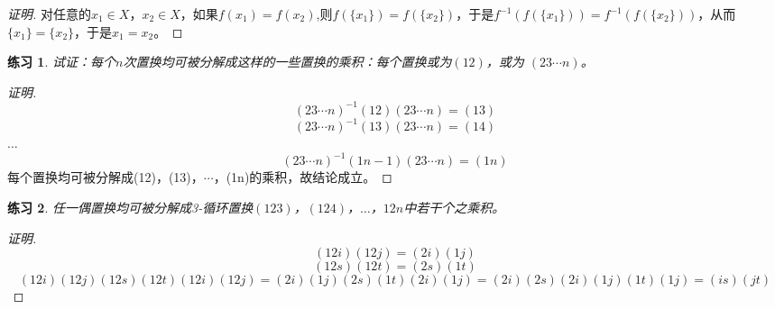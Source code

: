 \documentclass{article}
\newtheorem{Exercise}{练习}
\begin{document}
\begin{CJK*}{UTF8}{gbsn}
\begin{proof}[证明]
        对任意的$x_1\in X$，$x_2\in X$，如果$f(x_1)=f(x_2)$,则$f(\{x_1\})=f(\{x_2\})$，于是$f^{-1}(f(\{x_1\}))=f^{-1}(f(\{x_2\}))$，从而$\{x_1\}=\{x_2\}$，于是$x_1=x_2$。
        
      \end{proof}
  \clearpage     
  \begin{Exercise}
    试证：每个$n$次置换均可被分解成这样的一些置换的乘积：每个置换或为$(12)$，或为
    $(23\cdots n)$。  
    \end{Exercise}
    \begin{proof}[证明]
      \[(23\cdots n)^{-1}(12)(23\cdots n) = (13)\]
      \[(23\cdots n)^{-1}(13)(23\cdots n) = (14)\]
      $\ldots$
      \[(23\cdots n)^{-1}(1 n-1)(23\cdots n) = (1 n)\]
      每个置换均可被分解成(12)，(13)，$\cdots$，(1n)的乘积，故结论成立。
    \end{proof}

    \begin{Exercise}
      任一偶置换均可被分解成3-循环置换$(123)$，$(124)$，$\ldots$，$12n$中若干个之乘积。 
      \end{Exercise}
      \begin{proof}[证明]
        \[(12i)(12j)=(2i)(1j)\]
        \[(12s)(12t)=(2s)(1t)\]
        \[(12i)(12j)(12s)(12t)(12i)(12j)=(2i)(1j)(2s)(1t)(2i)(1j)=(2i)(2s)(2i)(1j)(1t)(1j)=(is)(jt)\]
      \end{proof}
      
        
  
  
\chapter{}

\end{CJK*}
\end{document}
